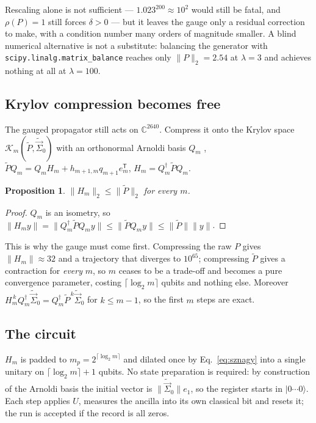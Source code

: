 \documentclass[aps,prx,twocolumn,superscriptaddress,nofootinbib,longbibliography]{revtex4-2}
\theoremstyle{plain}
\newtheorem{proposition}{Proposition}
\newcommand{\ket}[1]{|#1\rangle}
\newcommand{\adj}{^{\dagger}}
\newcommand{\norm}[1]{\lVert#1\rVert}
\begin{document}
Rescaling alone is not sufficient --- $1.023^{200}\approx10^{2}$ would still be
fatal, and $\rho(P)=1$ still forces $\delta>0$ --- but it leaves the gauge only a
residual correction to make, with a condition number many orders of magnitude
smaller.  A blind numerical alternative is not a substitute: balancing the
generator with \texttt{scipy.linalg.matrix\_balance} reaches only
$\norm{P}_2=2.54$ at $\lambda=3$ and achieves nothing at all at $\lambda=100$.

\subsection{Krylov compression becomes free}

The gauged propagator still acts on $\mathbb C^{2640}$.  Compress it onto the
Krylov space $\mathcal K_m(\tilde P,\tilde{\vec\Sigma}_0)$ with an orthonormal
Arnoldi basis $Q_m$ \cite{Saad1992},
$\tilde P Q_m=Q_mH_m+h_{m+1,m}q_{m+1}e_m^{\mathsf T}$,
$H_m=Q_m\adj\tilde PQ_m$.

\begin{proposition}
$\norm{H_m}_2\le\norm{\tilde P}_2$ for every $m$.
\end{proposition}

\begin{proof}
$Q_m$ is an isometry, so
$\norm{H_my}=\norm{Q_m\adj\tilde PQ_my}\le\norm{\tilde PQ_my}
\le\norm{\tilde P}\norm{y}$.
\end{proof}

This is why the gauge must come first.  Compressing the raw $P$ gives
$\norm{H_m}\approx32$ and a trajectory that diverges to $10^{65}$; compressing
$\tilde P$ gives a contraction for \emph{every} $m$, so $m$ ceases to be a
trade-off and becomes a pure convergence parameter, costing
$\lceil\log_2m\rceil$ qubits and nothing else.  Moreover $H_m^{\,k}Q_m\adj
\tilde{\vec\Sigma}_0=Q_m\adj\tilde P^{\,k}\tilde{\vec\Sigma}_0$ for $k\le m-1$,
so the first $m$ steps are exact.

\subsection{The circuit}

$H_m$ is padded to $m_p=2^{\lceil\log_2m\rceil}$ and dilated once by
Eq.~\eqref{eq:sznagy} into a single unitary on $\lceil\log_2m\rceil+1$ qubits.
No state preparation is required: by construction of the Arnoldi basis the
initial vector is $\norm{\tilde{\vec\Sigma}_0}e_1$, so the register starts in
$\ket{0\cdots0}$.  Each step applies $U$, measures the ancilla into its own
classical bit and resets it; the run is accepted if the record is all zeros.
\end{document}
